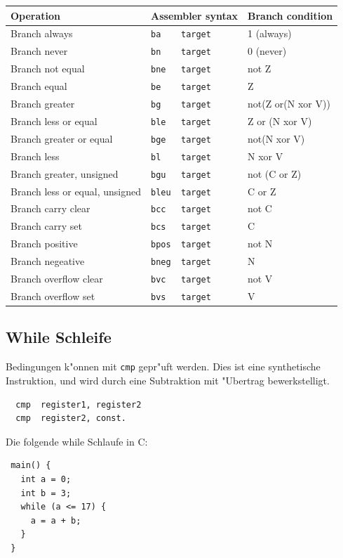 \documentclass[german, 10pt, a4paper, twocolumn]{scrartcl}
\begin{document}
\scriptsize
\begin{tabular}{lll}
	Operation &		Assembler syntax &	Branch condition \\ \hline
	Branch always &		\verb#ba    target# &	1 (always)\\
	Branch never &		\verb#bn    target# &     0 (never)\\
	Branch not equal &	\verb#bne   target# &	not Z\\
	Branch equal &		\verb#be    target# &     Z\\
	Branch greater &	\verb#bg    target# &     not(Z or(N xor V))\\
	Branch less or equal &	\verb#ble   target# &    Z or (N xor V)\\
	Branch greater or equal &		\verb#bge   target# &     not(N xor V)\\
	Branch less &		\verb#bl    target# &     N xor V\\
	Branch greater, unsigned &		\verb#bgu   target# &     not (C or Z)\\
	Branch less or equal, unsigned &		\verb#bleu  target# &     C or Z\\
	Branch carry clear &	\verb#bcc   target# &     not C\\
	Branch carry set &	\verb#bcs   target# &     C\\
	Branch positive &	\verb#bpos  target# &     not N\\
	Branch negeative &	\verb#bneg  target# &     N\\
	Branch overflow clear &	\verb#bvc   target# &     not V\\
	Branch overflow set &	\verb#bvs   target# &     V\\
\end{tabular}
\normalsize

\subsection{While Schleife}

Bedingungen k"onnen mit \verb#cmp# gepr"uft werden. Dies ist eine synthetische Instruktion, und wird durch eine Subtraktion mit "Ubertrag bewerkstelligt.

\begin{verbatim}
  cmp  register1, register2
  cmp  register2, const.
\end{verbatim}

Die folgende while Schlaufe in C:
\begin{verbatim}
 main() {
   int a = 0;
   int b = 3;
   while (a <= 17) {
     a = a + b;
   }
 }
\end{verbatim}
\end{document}

